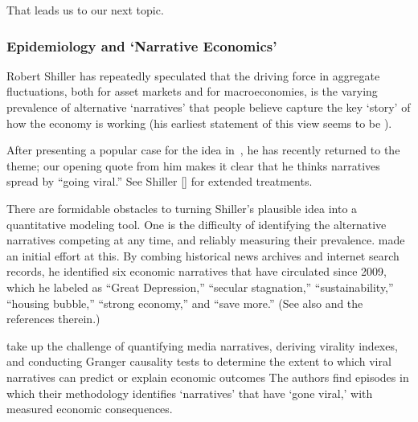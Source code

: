 That leads us to our next topic.


\hypertarget{narrativeApproach}{}
\subsubsection{Epidemiology and `Narrative Economics'}\label{narrativeApproach}

Robert Shiller has repeatedly speculated that the driving force in aggregate fluctuations, both for asset markets and for macroeconomies, is the varying prevalence of alternative `narratives' that people believe capture the key `story' of how the economy is working (his earliest statement of this view seems to be \href{https://www.jstor.org/stable/2117915}{\cite{shiller1995conversation}}).

After presenting a popular case for the idea in~\cite{akerlof2010animal}, he has recently returned to the theme; our opening quote from him makes it clear that he thinks narratives spread by ``going viral.''  See Shiller [\citeyear{shiller2017narrative,shiller_narrative_2019}] for extended treatments.

There are formidable obstacles to turning Shiller's plausible idea into a quantitative modeling tool.  One is the difficulty of identifying the alternative narratives competing at any time, and reliably measuring their prevalence.
\href{https://github.com/iworld1991/EpiExp/blob/master/Literature/shiller2020popular.pdf}{\cite{shiller2020popular}} made an initial effort at this.  By combing historical news archives and internet search records, he identified six economic narratives that have circulated since 2009, which he labeled as ``Great Depression,'' ``secular stagnation,'' ``sustainability,'' ``housing bubble,'' ``strong economy,'' and ``save more.''  (See also  \cite{ash2021text} and the references therein.)

\cite{larsen2019business} take up the challenge of quantifying media narratives, deriving virality indexes, and conducting Granger causality tests to determine the extent to which viral narratives can predict or explain economic outcomes  The authors find episodes in which their methodology identifies `narratives' that have `gone viral,' with measured economic consequences.  %

